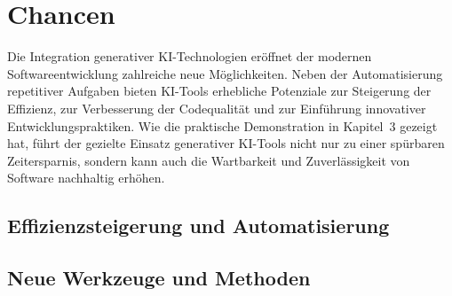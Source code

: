 \chapter{Chancen}
Die Integration generativer KI-Technologien eröffnet der modernen
Softwareentwicklung zahlreiche neue Möglichkeiten. Neben der Automatisierung
repetitiver Aufgaben bieten KI-Tools erhebliche Potenziale zur Steigerung der
Effizienz, zur Verbesserung der Codequalität und zur Einführung innovativer
Entwicklungspraktiken. Wie die praktische Demonstration in Kapitel~3 gezeigt
hat, führt der gezielte Einsatz generativer KI-Tools nicht nur zu einer
spürbaren Zeitersparnis, sondern kann auch die Wartbarkeit und Zuverlässigkeit
von Software nachhaltig erhöhen.

\section{Effizienzsteigerung und Automatisierung}


\section{Neue Werkzeuge und Methoden}



% 

% 

